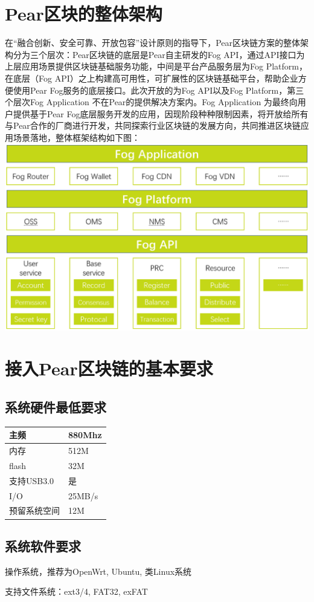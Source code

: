 \section{Pear区块的整体架构}
在“融合创新、安全可靠、开放包容”设计原则的指导下，Pear区块链方案的整体架构分为三个层次：Pear区块链的底层是Pear自主研发的Fog API，通过API接口为上层应用场景提供区块链基础服务功能，中间是平台产品服务层为Fog Platform，在底层（Fog API）之上构建高可用性，可扩展性的区块链基础平台，帮助企业方便使用Pear Fog服务的底层接口。此次开放的为Fog API以及Fog Platform，第三个层次Fog Application 不在Pear的提供解决方案内。Fog Application 为最终向用户提供基于Pear Fog底层服务开发的应用，因现阶段种种限制因素，将开放给所有与Pear合作的厂商进行开发，共同探索行业区块链的发展方向，共同推进区块链应用场景落地，整体框架结构如下图：
\includegraphics[width= 6.5 in]{frame.eps}



\section{接入Pear区块链的基本要求}
\subsection{系统硬件最低要求}
\begin{table}[!htb] 
\Large    
\begin{center}  
\begin{tabular}{|l|l|}  
\hline  
主频 & 880Mhz\\ \hline  
内存  & 512M \\ \hline  
flash& 32M\\ \hline
支持USB3.0& 是 \\ \hline
I/O & 25MB/s \\ \hline
预留系统空间&12M \\ \hline
\end{tabular}  
\end{center}  
\end{table}  
\subsection{系统软件要求}
操作系统，推荐为OpenWrt, Ubuntu, 类Linux系统 \par 
支持文件系统：ext3/4, FAT32, exFAT 



